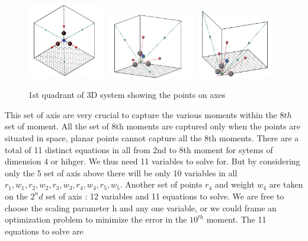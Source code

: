 \documentclass{article}
\begin{document}
\begin{figure}[h]
	\centering
	\includegraphics[width=0.3\textwidth]{3d2.jpg}
	\includegraphics[width=0.35\textwidth]{3d3.jpg}
	\includegraphics[width=0.3\textwidth]{3d4.jpg}
	\caption{1st quadrant of 3D system showing the points on axes}
	\label{fig:eye3quadpts}
\end{figure}
\newline This set of axis are very crucial to capture the various moments within the $8th$ set of moment. All the set of 8th moments are captured only when the points are situated in space, planar points cannot capture all the 8th moments. There are a total of 11 distinct equations in all from 2nd to 8th moment for sytems of dimension 4 or hihger. We thus need 11 variables to solve for. But by considering only the 5 set of axis above there will be only 10 variables in all $r_1,w_1,r_2,w_2,r_3,w_3,r_4,w_4,r_5,w_5$. Another set of points $r_4$ and weight $w_4$ are taken on the $2^nd$ set of axis : 12 variables and 11 equations to solve. We are free to choose the scaling parameter h and any one variable, or we could frame an optimization problem to minimize the error in the $10^{th}$ moment. The 11 equations to solve are
\end{document}

